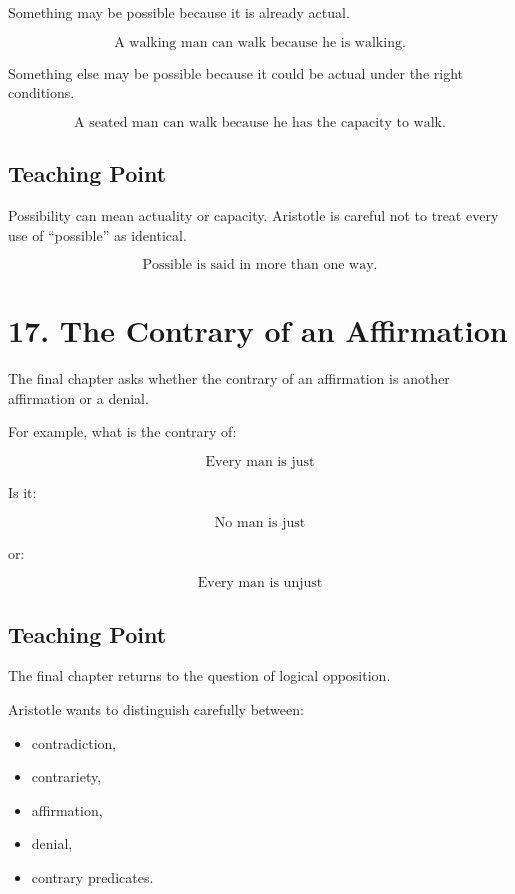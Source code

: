 \documentclass[12pt]{article}
\begin{document}
Something may be possible because it is already actual.

\[
\text{A walking man can walk because he is walking.}
\]

Something else may be possible because it could be actual under the right
conditions.

\[
\text{A seated man can walk because he has the capacity to walk.}
\]

\subsection*{Teaching Point}

Possibility can mean actuality or capacity. Aristotle is careful not to treat
every use of ``possible'' as identical.

\[
\boxed{
\text{Possible is said in more than one way.}
}
\]

\section*{17. The Contrary of an Affirmation}

The final chapter asks whether the contrary of an affirmation is another
affirmation or a denial.

For example, what is the contrary of:

\[
\text{Every man is just}
\]

Is it:

\[
\text{No man is just}
\]

or:

\[
\text{Every man is unjust}
\]

\subsection*{Teaching Point}

The final chapter returns to the question of logical opposition.

Aristotle wants to distinguish carefully between:

\begin{itemize}[itemsep=0.25em]
    \item contradiction,
    \item contrariety,
    \item affirmation,
    \item denial,
    \item contrary predicates.
\end{itemize}
\end{document}
